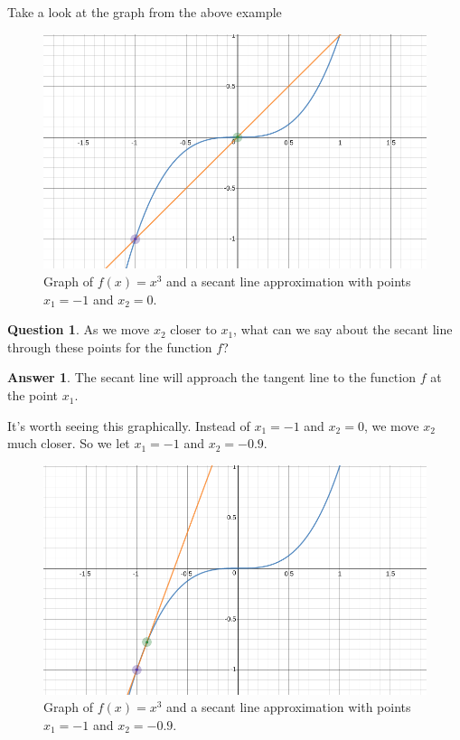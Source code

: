 \documentclass[12pt]{article}
\theoremstyle{definition}
\newtheorem{question}{Question}[section]
\newtheorem{answer}{Answer}[section]
\begin{document}
Take a look at the graph from the above example
\begin{figure}[h]
    \centering
    \includegraphics[scale=.3]{secant_line_1.png}
    \caption{Graph of $f(x)=x^3$ and a secant line approximation with points $x_1=-1$ and $x_2=0$.}
    \label{fig:secant_line_1}
\end{figure}

\begin{question}
As we move $x_2$ closer to $x_1$, what can we say about the secant line through these points for the function $f$?
\end{question}

\begin{answer}
The secant line will approach the tangent line to the function $f$ at the point $x_1$.
\end{answer}

It's worth seeing this graphically. Instead of $x_1=-1$ and $x_2=0$, we move $x_2$ much closer. So we let $x_1=-1$ and $x_2 = -0.9$.
\begin{figure}[h]
    \centering
    \includegraphics[scale=.3]{secant_line_2.png}
    \caption{Graph of $f(x)=x^3$ and a secant line approximation with points $x_1=-1$ and $x_2=-0.9$.}
    \label{fig:secant_line_2}
\end{figure}
\end{document}
